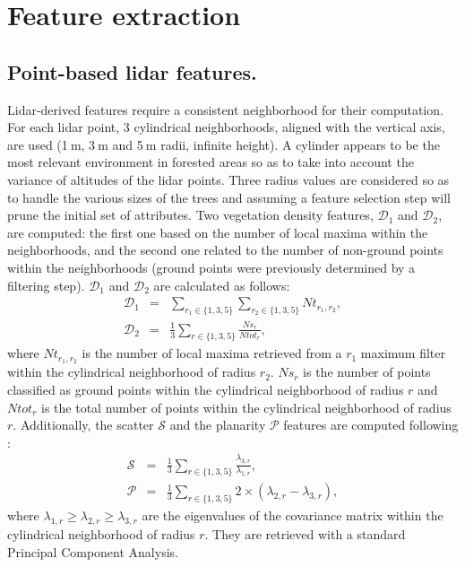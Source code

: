 \section{Feature extraction}
\subsection{Point-based lidar features.}
Lidar-derived features require a consistent neighborhood for their computation. For each lidar point, 3 cylindrical neighborhoods, aligned with the vertical axis, are used (1$\:$m, 3$\:$m and 5$\:$m radii, infinite height). A cylinder appears to be the most relevant environment in forested areas so as to take into account the variance of altitudes of the lidar points. Three radius values are considered so as to handle the various sizes of the trees and assuming a feature selection step will prune the initial set of attributes. Two vegetation density features, $\mathcal{D}_{1}$ and $\mathcal{D}_{2}$, are computed: the first one based on the number of local maxima within the neighborhoods, and the second one related to the number of non-ground points within the neighborhoods (ground points were previously determined by a filtering step). $\mathcal{D}_{1}$ and $\mathcal{D}_{2}$ are calculated as follows:
\begin{eqnarray}
\mathcal{D}_{1} & = & \sum_{r_{1} \in \{1,3,5\}}\sum_{r_{2} \in \{1,3,5\}}Nt_{r_{1},r_{2}}, \\
\mathcal{D}_{2} & = & \frac{1}{3}\sum_{r \in \{1,3,5\}}\frac{Ns_{r}}{Ntot_{r}},
\end{eqnarray}
where $Nt_{r_{1},r_{2}}$ is the number of local maxima retrieved from a $r_{1}$ maximum filter within the cylindrical neighborhood of radius $r_{2}$. $Ns_{r}$ is the number of points classified as ground points within the cylindrical neighborhood of radius $r$ and $Ntot_{r}$ is the total number of points within the cylindrical neighborhood of radius $r$. Additionally, the scatter $\mathcal{S}$ and the planarity $\mathcal{P}$ features are computed following \citet{Weinmann2015286}:
\begin{eqnarray}
\mathcal{S} & = & \frac{1}{3}\sum_{r \in \{1,3,5\}}\frac{\lambda_{3,r}}{\lambda_{1,r}}, \\
\mathcal{P} & = & \frac{1}{3}\sum_{r \in \{1,3,5\}}2\times(\lambda_{2,r}-\lambda_{3,r}),
\end{eqnarray}
where $\lambda_{1,r}\geq\lambda_{2,r}\geq\lambda_{3,r}$ are the eigenvalues of the covariance matrix within the cylindrical neighborhood of radius $r$. They are retrieved with a standard Principal Component Analysis. \\
